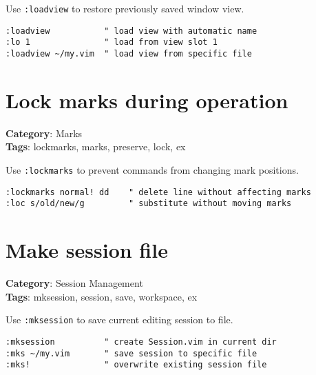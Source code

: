 {{{{{Use {\footnotesize \Verb§:loadview§} to restore previously saved window view.

\begin{Exa*}{}
\begin{Verbatim}[fontsize=\footnotesize, breaklines, breakanywhere]
:loadview           " load view with automatic name
:lo 1               " load from view slot 1
:loadview ~/my.vim  " load view from specific file
\end{Verbatim}
\end{Exa*}

\section{Lock marks during operation}

\textbf{Category}: Marks\\ \textbf{Tags}: lockmarks, marks, preserve, lock, ex
\vspace{0.5cm}

Use {\footnotesize \Verb§:lockmarks§} to prevent commands from changing mark positions.

\begin{Exa*}{}
\begin{Verbatim}[fontsize=\footnotesize, breaklines, breakanywhere]
:lockmarks normal! dd    " delete line without affecting marks
:loc s/old/new/g         " substitute without moving marks
\end{Verbatim}
\end{Exa*}

\section{Make session file}

\textbf{Category}: Session Management\\ \textbf{Tags}: mksession, session, save, workspace, ex
\vspace{0.5cm}

Use {\footnotesize \Verb§:mksession§} to save current editing session to file.

\begin{Exa*}{}
\begin{Verbatim}[fontsize=\footnotesize, breaklines, breakanywhere]
:mksession          " create Session.vim in current dir
:mks ~/my.vim       " save session to specific file
:mks!               " overwrite existing session file
\end{Verbatim}
\end{Exa*}

}}}}}
